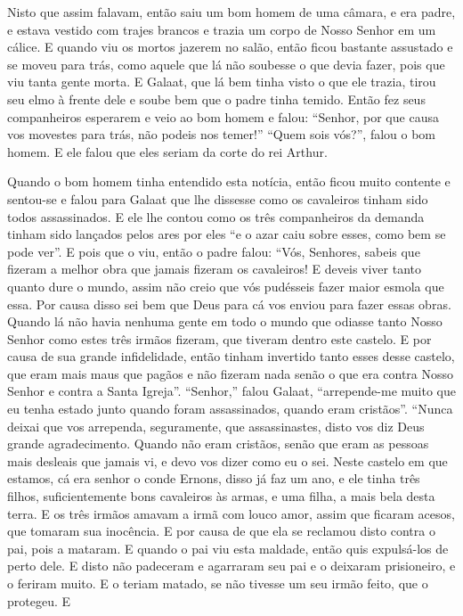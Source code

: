 Nisto que assim falavam, então saiu um bom homem de uma câmara, e era padre, e
estava vestido com trajes brancos e trazia um corpo de Nosso Senhor em um
cálice. E quando viu os mortos jazerem no salão, então ficou bastante assustado
e se moveu para trás, como aquele que lá não soubesse o que devia fazer, pois
que viu tanta gente morta. E Galaat, que lá bem tinha visto o que ele trazia,
tirou seu elmo à frente dele e soube bem que o padre tinha temido. Então fez
seus companheiros esperarem e veio ao bom homem e falou: “Senhor, por que causa
vos movestes para trás, não podeis nos temer!” “Quem sois vós?”, falou o bom
homem. E ele falou que eles seriam da corte do rei Arthur.  

Quando o bom homem tinha entendido esta notícia, então ficou muito contente e
sentou-se e falou para Galaat que lhe dissesse como os cavaleiros tinham sido
todos assassinados. E ele lhe contou como os três companheiros da demanda
tinham sido lançados pelos ares por eles “e o azar caiu sobre esses, como bem
se pode ver”. E pois que o viu, então o padre falou: “Vós, Senhores, sabeis que
fizeram a melhor obra que jamais fizeram os cavaleiros! E deveis viver tanto
quanto dure o mundo, assim não creio que vós pudésseis fazer maior esmola que
essa. Por causa disso sei bem que Deus para cá vos enviou para fazer essas
obras. Quando lá não havia nenhuma gente em todo o mundo que odiasse tanto
Nosso Senhor como estes três irmãos fizeram, que tiveram dentro este castelo. E
por causa de sua grande infidelidade, então tinham invertido tanto esses desse
castelo, que eram mais maus que pagãos e não fizeram nada senão o que era
contra Nosso Senhor e contra a Santa Igreja”. “Senhor,” falou Galaat,
“arrepende-me muito que eu tenha estado junto quando foram assassinados, quando
eram cristãos”. “Nunca deixai que vos arrependa, seguramente, que
assassinastes, disto vos diz Deus grande agradecimento. Quando não eram
cristãos, senão que eram as pessoas mais desleais que jamais vi, e devo vos
dizer como eu o sei. Neste castelo em que estamos, cá era senhor o conde
Ernons, disso já faz um ano, e ele tinha três filhos, suficientemente bons
cavaleiros às armas, e uma filha, a mais bela desta terra. E os três irmãos
amavam a irmã com louco amor, assim que ficaram acesos, que tomaram sua
inocência. E por causa de que ela se reclamou disto contra o pai, pois a
mataram. E quando o pai viu esta maldade, então quis expulsá-los de perto dele.
E disto não padeceram e agarraram seu pai e o deixaram prisioneiro, e o feriram
muito. E o teriam matado, se não tivesse um seu irmão feito, que o protegeu. E
